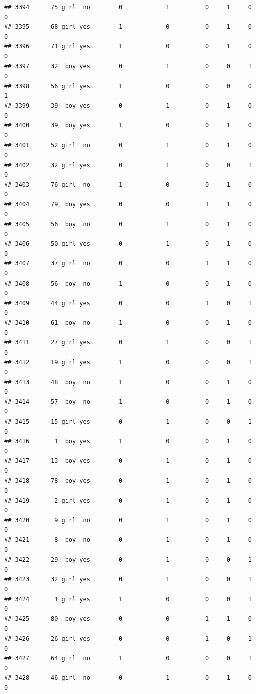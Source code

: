 \documentclass[man]{apa6}
\begin{document}
\begin{verbatim}
## 3394      75 girl  no        0            1          0     1     0     0
## 3395      68 girl yes        1            0          0     1     0     0
## 3396      71 girl yes        1            0          0     1     0     0
## 3397      32  boy yes        0            1          0     0     1     0
## 3398      56 girl yes        1            0          0     0     0     1
## 3399      39  boy yes        0            1          0     1     0     0
## 3400      39  boy yes        1            0          0     1     0     0
## 3401      52 girl  no        0            1          0     1     0     0
## 3402      32 girl yes        0            1          0     0     1     0
## 3403      76 girl  no        1            0          0     1     0     0
## 3404      79  boy yes        0            0          1     1     0     0
## 3405      56  boy  no        0            1          0     1     0     0
## 3406      50 girl yes        0            1          0     1     0     0
## 3407      37 girl  no        0            0          1     1     0     0
## 3408      56  boy  no        1            0          0     1     0     0
## 3409      44 girl yes        0            0          1     0     1     0
## 3410      61  boy  no        1            0          0     1     0     0
## 3411      27 girl yes        0            1          0     0     1     0
## 3412      19 girl yes        1            0          0     0     1     0
## 3413      48  boy  no        1            0          0     1     0     0
## 3414      57  boy  no        1            0          0     1     0     0
## 3415      15 girl yes        0            1          0     0     1     0
## 3416       1  boy yes        1            0          0     1     0     0
## 3417      13  boy yes        0            1          0     1     0     0
## 3418      78  boy yes        0            1          0     1     0     0
## 3419       2 girl yes        0            1          0     1     0     0
## 3420       9 girl  no        0            1          0     1     0     0
## 3421       8  boy  no        0            1          0     1     0     0
## 3422      29  boy yes        0            1          0     0     1     0
## 3423      32 girl yes        0            1          0     0     1     0
## 3424       1 girl yes        1            0          0     0     1     0
## 3425      80  boy yes        0            0          1     1     0     0
## 3426      26 girl yes        0            0          1     0     1     0
## 3427      64 girl  no        1            0          0     0     1     0
## 3428      46 girl  no        0            1          0     1     0     0

\end{verbatim}
\end{document}
